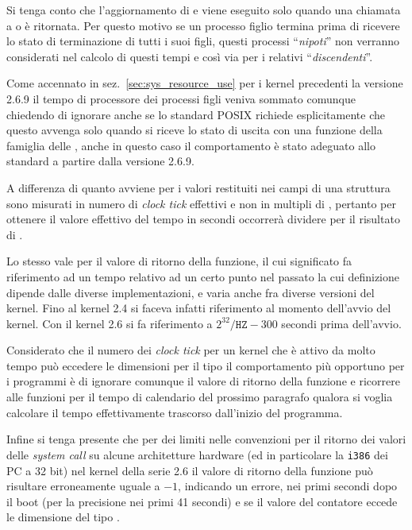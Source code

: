 Si tenga conto che l'aggiornamento di  e 
viene eseguito solo quando una chiamata a  o  è
ritornata. Per questo motivo se un processo figlio termina prima di ricevere
lo stato di terminazione di tutti i suoi figli, questi processi
``\textsl{nipoti}'' non verranno considerati nel calcolo di questi tempi e
così via per i relativi ``\textsl{discendenti}''. 

Come accennato in sez.~\ref{sec:sys_resource_use} per i kernel precedenti la
versione 2.6.9 il tempo di processore dei processi figli veniva sommato
comunque chiedendo di ignorare  anche se lo standard POSIX
richiede esplicitamente che questo avvenga solo quando si riceve lo stato di
uscita con una funzione della famiglia delle , anche in questo caso
il comportamento è stato adeguato allo standard a partire dalla versione
2.6.9.

A differenza di quanto avviene per  i valori restituiti nei campi
di una struttura  sono misurati in numero di \textit{clock tick}
effettivi e non in multipli di , pertanto per ottenere
il valore effettivo del tempo in secondi occorrerà dividere per il risultato
di .

Lo stesso vale per il valore di ritorno della funzione, il cui significato fa
riferimento ad un tempo relativo ad un certo punto nel passato la cui
definizione dipende dalle diverse implementazioni, e varia anche fra diverse
versioni del kernel. Fino al kernel 2.4 si faceva infatti riferimento al
momento dell'avvio del kernel. Con il kernel 2.6 si fa riferimento a
$2^{32}/\mathtt{HZ}-300$ secondi prima dell'avvio. 

Considerato che il numero dei \textit{clock tick} per un kernel che è attivo
da molto tempo può eccedere le dimensioni per il tipo  il
comportamento più opportuno per i programmi è di ignorare comunque il valore
di ritorno della funzione e ricorrere alle funzioni per il tempo di calendario
del prossimo paragrafo qualora si voglia calcolare il tempo effettivamente
trascorso dall'inizio del programma.

Infine si tenga presente che per dei limiti nelle convenzioni per il ritorno
dei valori delle \textit{system call} su alcune architetture hardware (ed in
particolare la \texttt{i386} dei PC a 32 bit) nel kernel della serie 2.6 il
valore di ritorno della funzione può risultare erroneamente uguale a $-1$,
indicando un errore, nei primi secondi dopo il boot (per la precisione nei
primi 41 secondi) e se il valore del contatore eccede le dimensione del tipo
.


